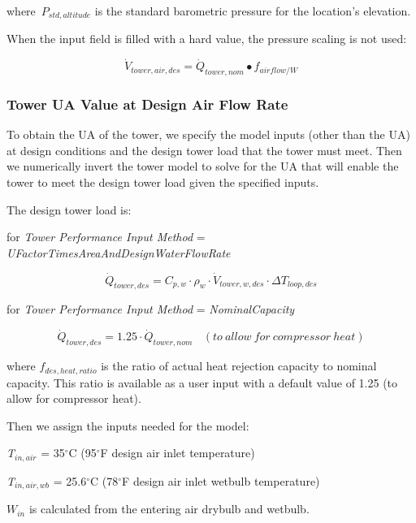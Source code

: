 where~\({P_{std,altitude}}\) is the standard barometric pressure for the location's elevation.

When the input field is filled with a hard value, the pressure scaling is not used:

\begin{equation}
{\dot V_{tower,air,des}} = {\dot Q_{tower,nom}} \bullet {f_{airflow/W}}
\end{equation}

\subsubsection{Tower UA Value at Design Air Flow Rate}\label{tower-ua-value-at-design-air-flow-rate}

To obtain the UA of the tower, we specify the model inputs (other than the UA) at design conditions and the design tower load that the tower must meet. Then we numerically invert the tower model to solve for the UA that will enable the tower to meet the design tower load given the specified inputs.

The design tower load is:

for \emph{Tower Performance Input Method} = \emph{UFactorTimesAreaAndDesignWaterFlowRate}

\begin{equation}
\dot Q_{tower,des} = C_{p,w} \cdot \rho_{w} \cdot \dot V_{tower,w,des} \cdot \Delta T_{loop,des}
\end{equation}

for \emph{Tower Performance Input Method} = \emph{NominalCapacity}

\begin{equation}
\dot Q_{tower,des} = 1.25 \cdot \dot Q_{tower,nom}~~~~(to~allow~for~compressor~heat)
\end{equation}

where \({f_{des,heat,ratio}}\) is the ratio of actual heat rejection capacity to nominal capacity. This ratio is available as a user input with a default value of 1.25 (to allow for compressor heat).

Then we assign the inputs needed for the model:

\emph{T\(_{in,air}\)} = 35\(^{\circ}\)C (95\(^{\circ}\)F design air inlet temperature)

\emph{T\(_{in,air,wb}\)} = 25.6\(^{\circ}\)C (78\(^{\circ}\)F design air inlet wetbulb temperature)

\(W_{in}\) is calculated from the entering air drybulb and wetbulb.

